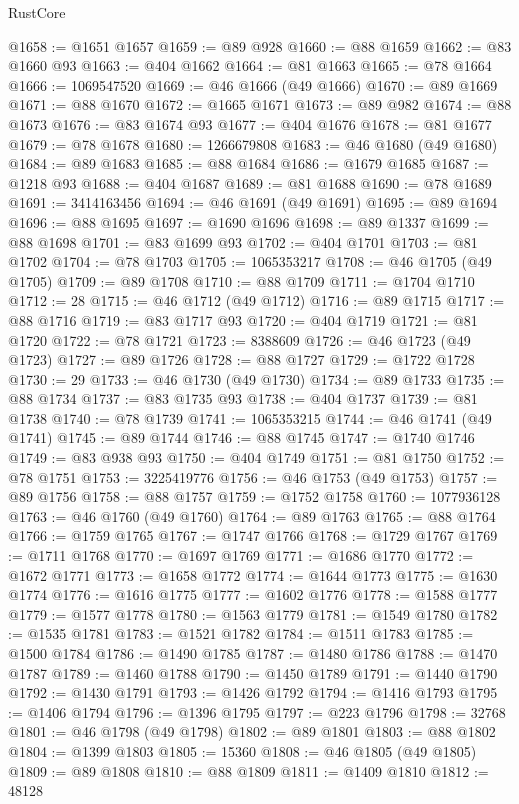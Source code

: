 \begin{lexlean}{RustCore}
\begin{coremodule}
@1658 := @1651 @1657
@1659 := @89 @928
@1660 := @88 @1659
@1662 := @83 @1660 @93
@1663 := @404 @1662
@1664 := @81 @1663
@1665 := @78 @1664
@1666 := 1069547520
@1669 := @46 @1666 (@49 @1666)
@1670 := @89 @1669
@1671 := @88 @1670
@1672 := @1665 @1671
@1673 := @89 @982
@1674 := @88 @1673
@1676 := @83 @1674 @93
@1677 := @404 @1676
@1678 := @81 @1677
@1679 := @78 @1678
@1680 := 1266679808
@1683 := @46 @1680 (@49 @1680)
@1684 := @89 @1683
@1685 := @88 @1684
@1686 := @1679 @1685
@1687 := @1218 @93
@1688 := @404 @1687
@1689 := @81 @1688
@1690 := @78 @1689
@1691 := 3414163456
@1694 := @46 @1691 (@49 @1691)
@1695 := @89 @1694
@1696 := @88 @1695
@1697 := @1690 @1696
@1698 := @89 @1337
@1699 := @88 @1698
@1701 := @83 @1699 @93
@1702 := @404 @1701
@1703 := @81 @1702
@1704 := @78 @1703
@1705 := 1065353217
@1708 := @46 @1705 (@49 @1705)
@1709 := @89 @1708
@1710 := @88 @1709
@1711 := @1704 @1710
@1712 := 28
@1715 := @46 @1712 (@49 @1712)
@1716 := @89 @1715
@1717 := @88 @1716
@1719 := @83 @1717 @93
@1720 := @404 @1719
@1721 := @81 @1720
@1722 := @78 @1721
@1723 := 8388609
@1726 := @46 @1723 (@49 @1723)
@1727 := @89 @1726
@1728 := @88 @1727
@1729 := @1722 @1728
@1730 := 29
@1733 := @46 @1730 (@49 @1730)
@1734 := @89 @1733
@1735 := @88 @1734
@1737 := @83 @1735 @93
@1738 := @404 @1737
@1739 := @81 @1738
@1740 := @78 @1739
@1741 := 1065353215
@1744 := @46 @1741 (@49 @1741)
@1745 := @89 @1744
@1746 := @88 @1745
@1747 := @1740 @1746
@1749 := @83 @938 @93
@1750 := @404 @1749
@1751 := @81 @1750
@1752 := @78 @1751
@1753 := 3225419776
@1756 := @46 @1753 (@49 @1753)
@1757 := @89 @1756
@1758 := @88 @1757
@1759 := @1752 @1758
@1760 := 1077936128
@1763 := @46 @1760 (@49 @1760)
@1764 := @89 @1763
@1765 := @88 @1764
@1766 := @1759 @1765
@1767 := @1747 @1766
@1768 := @1729 @1767
@1769 := @1711 @1768
@1770 := @1697 @1769
@1771 := @1686 @1770
@1772 := @1672 @1771
@1773 := @1658 @1772
@1774 := @1644 @1773
@1775 := @1630 @1774
@1776 := @1616 @1775
@1777 := @1602 @1776
@1778 := @1588 @1777
@1779 := @1577 @1778
@1780 := @1563 @1779
@1781 := @1549 @1780
@1782 := @1535 @1781
@1783 := @1521 @1782
@1784 := @1511 @1783
@1785 := @1500 @1784
@1786 := @1490 @1785
@1787 := @1480 @1786
@1788 := @1470 @1787
@1789 := @1460 @1788
@1790 := @1450 @1789
@1791 := @1440 @1790
@1792 := @1430 @1791
@1793 := @1426 @1792
@1794 := @1416 @1793
@1795 := @1406 @1794
@1796 := @1396 @1795
@1797 := @223 @1796
@1798 := 32768
@1801 := @46 @1798 (@49 @1798)
@1802 := @89 @1801
@1803 := @88 @1802
@1804 := @1399 @1803
@1805 := 15360
@1808 := @46 @1805 (@49 @1805)
@1809 := @89 @1808
@1810 := @88 @1809
@1811 := @1409 @1810
@1812 := 48128

\end{coremodule}
\end{lexlean}
